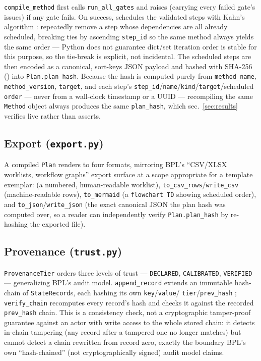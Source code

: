 \documentclass[
  english,
]{article}
\begin{document}
\texttt{compile\_method} first calls \texttt{run\_all\_gates} and raises
 (carrying every failed gate's issues) if
any gate fails. On success,  schedules the
validated steps with Kahn's algorithm \citep{kahn1962topological}:
repeatedly remove a step whose dependencies are all already scheduled,
breaking ties by ascending \texttt{step\_id} so the same method always
yields the same order --- Python does not guarantee dict/set iteration
order is stable for this purpose, so the tie-break is explicit, not
incidental. The scheduled steps are then encoded as a canonical,
sort-keys JSON payload and hashed with SHA-256
() into \texttt{Plan.plan\_hash}. Because
the hash is computed purely from \texttt{method\_name},
\texttt{method\_version}, \texttt{target}, and each step's
\texttt{step\_id}/\texttt{name}/\texttt{kind}/\texttt{target}/scheduled
\texttt{order} --- never from a wall-clock timestamp or a UUID ---
recompiling the same \texttt{Method} object always produces the same
\texttt{plan\_hash}, which sec.~\ref{sec:results} verifies live rather
than asserts.

\subsection{\texorpdfstring{Export
(\texttt{export.py})}{Export (export.py)}}\label{export-export.py}

A compiled \texttt{Plan} renders to four formats, mirroring BPL's
``CSV/XLSX worklists, workflow graphs'' export surface at a scope
appropriate for a template exemplar:  (a
numbered, human-readable worklist),
\texttt{to\_csv\_rows}/\texttt{write\_csv} (machine-readable rows),
\texttt{to\_mermaid} (a \texttt{flowchart\ TD} showing scheduled order),
and \texttt{to\_json}/\texttt{write\_json} (the exact canonical JSON the
plan hash was computed over, so a reader can independently verify
\texttt{Plan.plan\_hash} by re-hashing the exported file).

\subsection{\texorpdfstring{Provenance
(\texttt{trust.py})}{Provenance (trust.py)}}\label{provenance-trust.py}

\texttt{ProvenanceTier} orders three levels of trust ---
\texttt{DECLARED}, \texttt{CALIBRATED}, \texttt{VERIFIED} ---
generalizing BPL's audit model. \texttt{append\_record} extends an
immutable hash-chain of \texttt{StateRecord}s, each hashing its own
\texttt{key}/\texttt{value}/ \texttt{tier}/\texttt{prev\_hash}
\citep{merkle1987digital}; \texttt{verify\_chain} recomputes every
record's hash and checks it against the recorded \texttt{prev\_hash}
chain. This is a consistency check, not a cryptographic tamper-proof
guarantee against an actor with write access to the whole stored chain:
it detects in-chain tampering (any record after a tampered one no longer
matches) but cannot detect a chain rewritten from record zero, exactly
the boundary BPL's own ``hash-chained'' (not cryptographically signed)
audit model claims.
\end{document}
